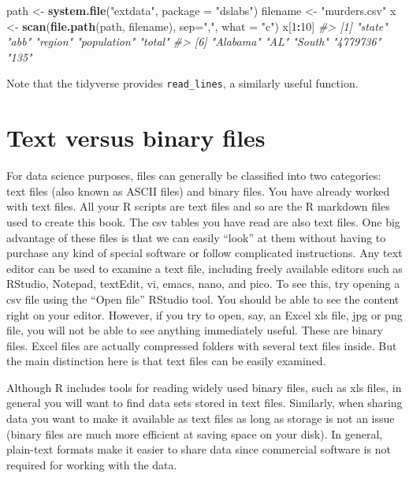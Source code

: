 \documentclass[
]{krantz}
\newenvironment{Shaded}{\begin{snugshade}}{\end{snugshade}}
\newcommand{\CommentTok}[1]{\textcolor[rgb]{0.37,0.37,0.37}{\textit{#1}}}
\newcommand{\DataTypeTok}[1]{\textcolor[rgb]{0.27,0.27,0.27}{#1}}
\newcommand{\DecValTok}[1]{\textcolor[rgb]{0.06,0.06,0.06}{#1}}
\newcommand{\KeywordTok}[1]{\textcolor[rgb]{0.27,0.27,0.27}{\textbf{#1}}}
\newcommand{\NormalTok}[1]{#1}
\newcommand{\OperatorTok}[1]{\textcolor[rgb]{0.43,0.43,0.43}{\textbf{#1}}}
\newcommand{\StringTok}[1]{\textcolor[rgb]{0.5,0.5,0.5}{#1}}
\begin{document}
\begin{Shaded}
\begin{Highlighting}[]
\NormalTok{path <-}\StringTok{ }\KeywordTok{system.file}\NormalTok{(}\StringTok{"extdata"}\NormalTok{, }\DataTypeTok{package =} \StringTok{"dslabs"}\NormalTok{)}
\NormalTok{filename <-}\StringTok{ "murders.csv"}
\NormalTok{x <-}\StringTok{ }\KeywordTok{scan}\NormalTok{(}\KeywordTok{file.path}\NormalTok{(path, filename), }\DataTypeTok{sep=}\StringTok{","}\NormalTok{, }\DataTypeTok{what =} \StringTok{"c"}\NormalTok{)}
\NormalTok{x[}\DecValTok{1}\OperatorTok{:}\DecValTok{10}\NormalTok{]}
\CommentTok{#>  [1] "state"      "abb"        "region"     "population" "total"     }
\CommentTok{#>  [6] "Alabama"    "AL"         "South"      "4779736"    "135"}
\end{Highlighting}
\end{Shaded}

Note that the tidyverse provides \texttt{read\_lines}, a similarly useful function.

\hypertarget{text-versus-binary-files}{%
\section{Text versus binary files}\label{text-versus-binary-files}}

For data science purposes, files can generally be classified into two categories: text files (also known as ASCII files) and binary files. You have already worked with text files. All your R scripts are text files and so are the R markdown files used to create this book. The csv tables you have read are also text files. One big advantage of these files is that we can easily ``look'' at them without having to purchase any kind of special software or follow complicated instructions. Any text editor can be used to examine a text file, including freely available editors such as RStudio, Notepad, textEdit, vi, emacs, nano, and pico. To see this, try opening a csv file using the ``Open file'' RStudio tool. You should be able to see the content right on your editor. However, if you try to open, say, an Excel xls file, jpg or png file, you will not be able to see anything immediately useful. These are binary files. Excel files are actually compressed folders with several text files inside. But the main distinction here is that text files can be easily examined.

Although R includes tools for reading widely used binary files, such as xls files, in general you will want to find data sets stored in text files. Similarly, when sharing data you want to make it available as text files as long as storage is not an issue (binary files are much more efficient at saving space on your disk). In general, plain-text formats make it easier to share data since commercial software is not required for working with the data.
\end{document}

